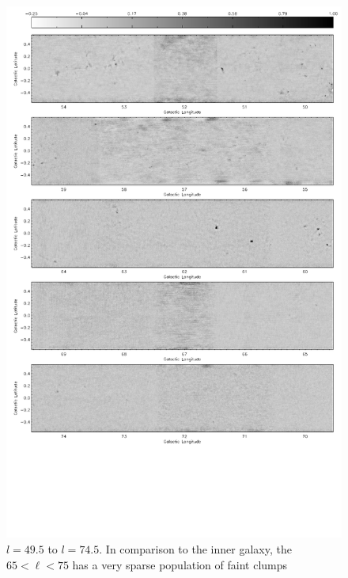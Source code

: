 \documentclass[12pt,preprint]{aastex}
\newcommand{\lon}{\ensuremath{l}}
\begin{document}
\addtocounter{figure}{-1}
\addtocounter{subfig}{1}

\begin{figure}
  \begin{minipage}{6.5in} 
    \begin{center}
      \includegraphics[scale=0.9]{fig1_pg3_bw_inv_bar_label}
      \caption{$\lon=49.5$ to $\lon=74.5$.  In comparison to the inner galaxy, the $65
      < \ell < 75$ has a very sparse population of faint clumps}
    \end{center}
  \end{minipage}
\end{figure}

\addtocounter{figure}{-1}
\addtocounter{subfig}{1}
\end{document}
